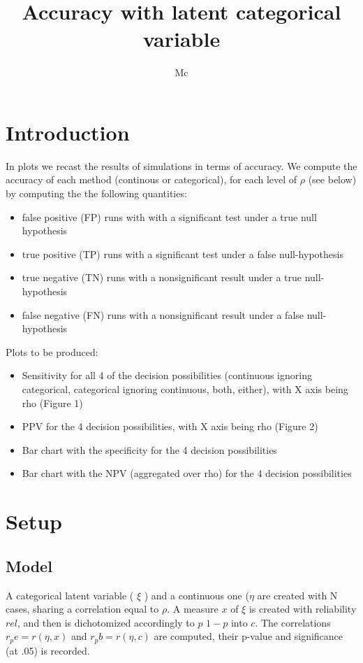 \documentclass{article}
\begin{document}


\title{Accuracy with latent categorical variable}

\author{Mc}
\maketitle
\section*{Introduction}
In plots we recast the results of simulations in terms of accuracy. We compute the accuracy of each method (continous or categorical), for each level of \(\rho\) (see below) by computing the  the following quantities:
\begin{itemize}
  \item false positive (FP)  runs with  with a significant test under a true null hypothesis
  \item true positive (TP) runs with a significant test under a false null-hypothesis 
  \item true negative (TN) runs  with a nonsignificant result under a true null-hypothesis
  \item false negative (FN) runs with a nonsignificant result under a false null-hypothesis

\end{itemize}

Plots to be produced:
\begin{itemize}
  \item Sensitivity for all 4 of the decision possibilities (continuous ignoring categorical, categorical ignoring continuous, both, either), with X axis being rho (Figure 1)
  \item PPV for the 4 decision possibilities, with X axis being rho (Figure 2)
  \item Bar chart with the specificity for the 4 decision possibilities
  \item Bar chart with the NPV (aggregated over rho) for the 4 decision possibilities
\end{itemize}

\section*{Setup}
\subsection*{Model}
A categorical latent variable ( \(\xi\) ) and a continuous one (\(\eta\) are created with N cases, sharing a correlation equal to \(\rho\). A measure \(x\) of \(\xi\) is created with reliability \(rel\), and then  is dichotomized accordingly to \(p\) \(1-p\) into \(c\). The correlations \( r_pe=r(\eta,x) \)  and \( r_pb=r(\eta,c) \) are computed, their p-value and significance (at .05) is recorded.
\end{document}
